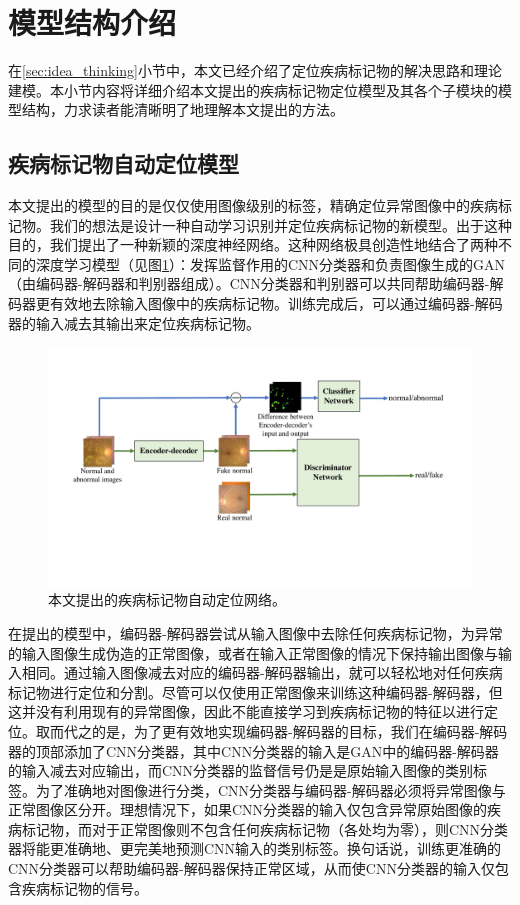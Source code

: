 \section{模型结构介绍}\label{sec:model_architecture_intro}
在\ref{sec:idea_thinking}小节中，本文已经介绍了定位疾病标记物的解决思路和理论建模。本小节内容将详细介绍本文提出的疾病标记物定位模型及其各个子模块的模型结构，力求读者能清晰明了地理解本文提出的方法。
\subsection{疾病标记物自动定位模型}\label{subsec:model_architecture}
本文提出的模型的目的是仅仅使用图像级别的标签，精确定位异常图像中的疾病标记物。我们的想法是设计一种自动学习识别并定位疾病标记物的新模型。出于这种目的，我们提出了一种新颖的深度神经网络。这种网络极具创造性地结合了两种不同的深度学习模型（见图\ref{fig:our_model_architecture}）：发挥监督作用的CNN分类器和负责图像生成的GAN（由编码器-解码器和判别器组成）。CNN分类器和判别器可以共同帮助编码器-解码器更有效地去除输入图像中的疾病标记物。训练完成后，可以通过编码器-解码器的输入减去其输出来定位疾病标记物。
\begin{figure}[h]
	\centering
	\includegraphics[width=1.0\textwidth]{figure/method.pdf}
	\caption[本文提出的疾病标记物自动定位网络]{本文提出的疾病标记物自动定位网络。} 
	\label{fig:our_model_architecture}
\end{figure}
在提出的模型中，编码器-解码器尝试从输入图像中去除任何疾病标记物，为异常的输入图像生成伪造的正常图像，或者在输入正常图像的情况下保持输出图像与输入相同。通过输入图像减去对应的编码器-解码器输出，就可以轻松地对任何疾病标记物进行定位和分割。尽管可以仅使用正常图像来训练这种编码器-解码器，但这并没有利用现有的异常图像，因此不能直接学习到疾病标记物的特征以进行定位。取而代之的是，为了更有效地实现编码器-解码器的目标，我们在编码器-解码器的顶部添加了CNN分类器，其中CNN分类器的输入是GAN中的编码器-解码器的输入减去对应输出，而CNN分类器的监督信号仍是是原始输入图像的类别标签。为了准确地对图像进行分类，CNN分类器与编码器-解码器必须将异常图像与正常图像区分开。理想情况下，如果CNN分类器的输入仅包含异常原始图像的疾病标记物，而对于正常图像则不包含任何疾病标记物（各处均为零），则CNN分类器将能更准确地、更完美地预测CNN输入的类别标签。换句话说，训练更准确的CNN分类器可以帮助编码器-解码器保持正常区域，从而使CNN分类器的输入仅包含疾病标记物的信号。

